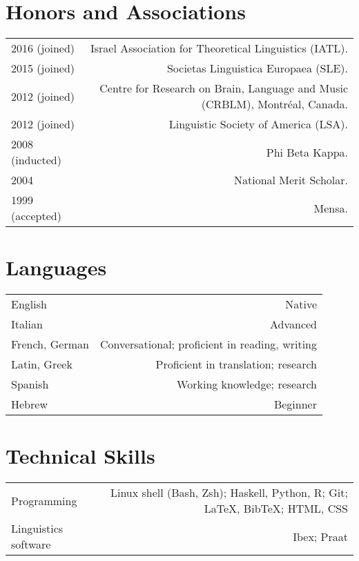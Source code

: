 \documentclass[12pt,letterpaper,twoside]{article}
\makeatletter
\newenvironment{cvsection}{%
  \setlength{\extrarowheight}{0.70ex}
  \begin{longtable}[l]{@{} L R @{}}
}{%
  \end{longtable}
}
\makeatother
\begin{document}
\section*{Honors and Associations}

\begin{cvsection}
  2016 {\footnotesize (joined)} & Israel Association for Theoretical Linguistics (IATL).\\
  2015 {\footnotesize (joined)} & Societas Linguistica Europaea (SLE).\\
  2012 {\footnotesize (joined)} & Centre for Research on Brain, Language and Music (CRBLM), Montr\'{e}al, Canada.\\
  2012 {\footnotesize (joined)} & Linguistic Society of America (LSA).\\
  2008 {\footnotesize (inducted)} & Phi Beta Kappa.\\
  2004 & National Merit Scholar.\\
  1999 {\footnotesize (accepted)} & Mensa.\\
\end{cvsection}

\section*{Languages}

\begin{cvsection}
  English & Native\\
  Italian & Advanced\\
  French, German & Conversational; proficient in reading, writing\\
  Latin, Greek & Proficient in translation; research\\
  Spanish & Working knowledge; research\\
  Hebrew & Beginner\\
\end{cvsection}

\section*{Technical Skills}

\begin{cvsection}
  Programming & Linux shell (Bash, Zsh); Haskell, Python, R; Git; \LaTeX, Bib\TeX; HTML, CSS\\
  Linguistics software & Ibex; Praat\\
\end{cvsection}
\end{document}
